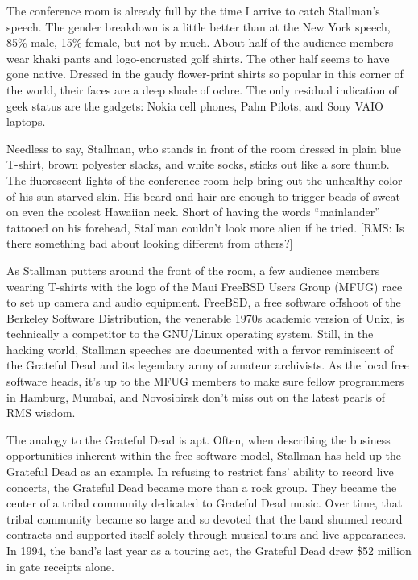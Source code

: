 The conference room is already full by the time I arrive to catch Stallman's speech. The gender breakdown is a little better than at the New York speech, 85\% male, 15\% female, but not by much. About half of the audience members wear khaki pants and logo-encrusted golf shirts. The other half seems to have gone native. Dressed in the gaudy flower-print shirts so popular in this corner of the world, their faces are a deep shade of ochre. The only residual indication of geek status are the gadgets: Nokia cell phones, Palm Pilots, and Sony VAIO laptops.

Needless to say, Stallman, who stands in front of the room dressed in plain blue T-shirt, brown polyester slacks, and white socks, sticks out like a sore thumb. The fluorescent lights of the conference room help bring out the unhealthy color of his sun-starved skin.  His beard and hair are enough to trigger beads of sweat on even the coolest Hawaiian neck. Short of having the words ``mainlander'' tattooed on his forehead, Stallman couldn't look more alien if he tried. [RMS: Is there something bad about looking different from others?]

As Stallman putters around the front of the room, a few audience members wearing T-shirts with the logo of the Maui FreeBSD Users Group (MFUG) race to set up camera and audio equipment. FreeBSD, a free software offshoot of the Berkeley Software Distribution, the venerable 1970s academic version of Unix, is technically a competitor to the GNU/Linux operating system. Still, in the hacking world, Stallman speeches are documented with a fervor reminiscent of the Grateful Dead and its legendary army of amateur archivists. As the local free software heads, it's up to the MFUG members to make sure fellow programmers in Hamburg, Mumbai, and Novosibirsk don't miss out on the latest pearls of RMS wisdom.

The analogy to the Grateful Dead is apt. Often, when describing the business opportunities inherent within the free software model, Stallman has held up the Grateful Dead as an example. In refusing to restrict fans' ability to record live concerts, the Grateful Dead became more than a rock group. They became the center of a tribal community dedicated to Grateful Dead music. Over time, that tribal community became so large and so devoted that the band shunned record contracts and supported itself solely through musical tours and live appearances. In 1994, the band's last year as a touring act, the Grateful Dead drew \$52 million in gate receipts alone.


